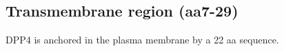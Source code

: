 \subsection{Transmembrane region (aa7-29)}

DPP4 is anchored in the plasma membrane by a 22 aa sequence. 